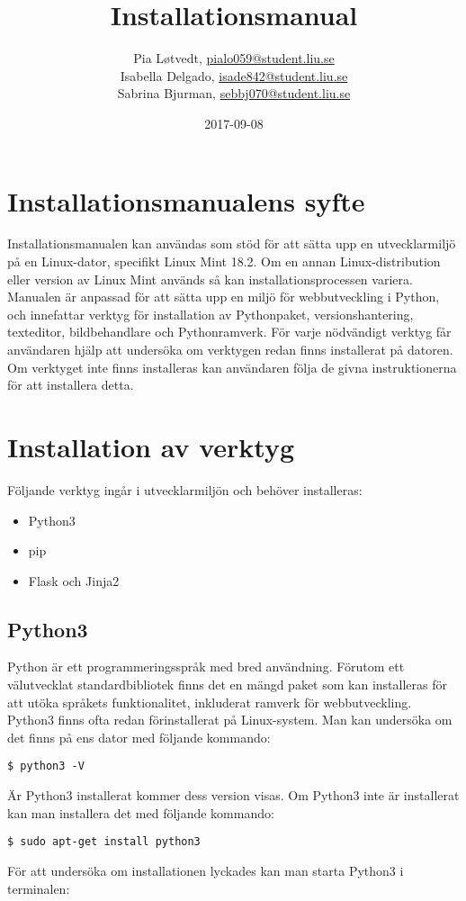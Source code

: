 \documentclass{TDP003mall}
\author{Pia Løtvedt, \url{pialo059@student.liu.se}\\
  Isabella Delgado, \url{isade842@student.liu.se}\\
  Sabrina Bjurman, \url{sebbj070@student.liu.se}}
\title{Installationsmanual}
\date{2017-09-08}
\begin{document}
\projectpage

\tableofcontents

\pagebreak
\section{Installationsmanualens syfte}
Installationsmanualen kan användas som stöd för att sätta upp en utvecklarmiljö på en Linux-dator, specifikt Linux Mint 18.2. Om en annan Linux-distribution eller version av Linux Mint används så kan installationsprocessen variera. Manualen är anpassad för att sätta upp en miljö för webbutveckling i Python, och innefattar verktyg för installation av Pythonpaket, versionshantering, texteditor, bildbehandlare och Pythonramverk. För varje nödvändigt verktyg får användaren hjälp att undersöka om verktygen redan finns installerat på datoren. Om verktyget inte finns installeras kan användaren följa de givna instruktionerna för att installera detta.

\pagebreak
\section{Installation av verktyg}
Följande verktyg ingår i utvecklarmiljön och behöver installeras:

\begin{itemize}
  \item Python3
  \item pip
  \item Flask och Jinja2
\end{itemize}

\subsection{Python3} \label{Python3} 
Python är ett programmeringsspråk med bred användning. Förutom ett välutvecklat standardbibliotek finns det en mängd paket som kan installeras för att utöka språkets funktionalitet, inkluderat ramverk för webbutveckling. Python3 finns ofta redan förinstallerat på Linux-system. Man kan undersöka om det finns på ens dator med följande kommando:

\verb|$ python3 -V|

Är Python3 installerat kommer dess version visas. Om Python3 inte är installerat kan man installera det med följande kommando:

\verb|$ sudo apt-get install python3|

För att undersöka om installationen lyckades kan man starta Python3 i terminalen:
\end{document}

